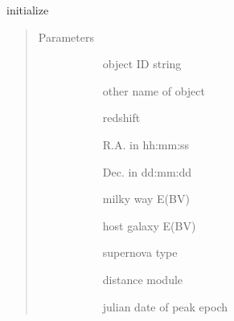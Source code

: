 \documentclass[letterpaper,10pt,english]{sphinxmanual}
\begin{document}
\begin{fulllineitems}
\label{\detokenize{generated/sdapy.snerun.snobject.__init__:sdapy.snerun.snobject.__init__}}
initialize 
\begin{quote}\begin{description}
\item[{Parameters}] \leavevmode\begin{description}
\item[{}] \leavevmode{[}\sphinxtitleref{str}{]}
object ID string

\item[{}] \leavevmode{[}\sphinxtitleref{str}{]}
other name of object

\item[{}] \leavevmode{[}\sphinxtitleref{float}{]}
redshift

\item[{}] \leavevmode{[}\sphinxtitleref{str}{]}
R.A. in hh:mm:ss

\item[{}] \leavevmode{[}\sphinxtitleref{str}{]}
Dec. in dd:mm:dd

\item[{}] \leavevmode{[}\sphinxtitleref{float}{]}
milky way E(B\sphinxhyphen{}V)

\item[{}] \leavevmode{[}\sphinxtitleref{float}{]}
host galaxy E(B\sphinxhyphen{}V)

\item[{}] \leavevmode{[}\sphinxtitleref{str}{]}
supernova type

\item[{}] \leavevmode{[}\sphinxtitleref{float}{]}
distance module

\item[{}] \leavevmode{[}\sphinxtitleref{float}{]}
julian date of peak epoch


\end{description}
\end{description}
\end{quote}
\end{fulllineitems}
\end{document}
